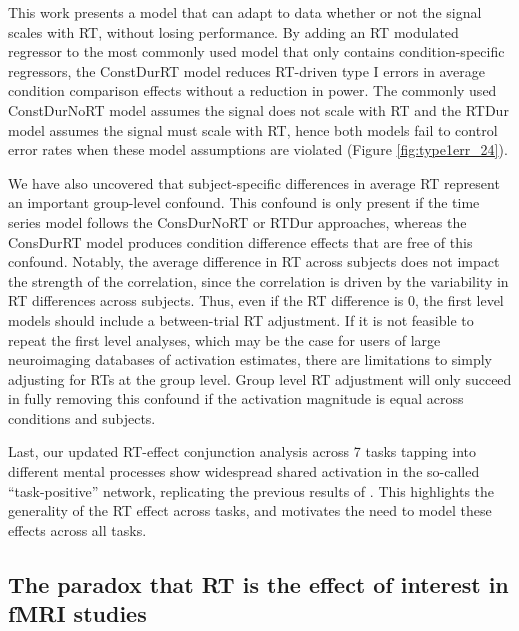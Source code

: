 \documentclass[titlepage,12pt] {article}
\begin{document}
This work presents a model that can adapt to data whether or not the signal scales with RT, without losing performance. By adding an RT modulated regressor to the most commonly used model that only contains condition-specific regressors, the ConstDurRT model reduces RT-driven type I errors in average condition comparison effects without a reduction in power.  The commonly used ConstDurNoRT model assumes the signal does not scale with RT and the RTDur model assumes the signal must scale with RT, hence both models fail to control error rates when these model assumptions are violated (Figure \ref{fig:type1err_24}).  


We have also uncovered that subject-specific differences in average RT represent an important group-level confound.  This confound is only present if the time series model follows the ConsDurNoRT or RTDur approaches, whereas the ConsDurRT model produces condition difference effects that are free of this confound.  Notably, the average difference in RT across subjects does not impact the strength of the correlation, since the correlation is driven by the variability in RT differences across subjects.  Thus, even if the RT difference is 0, the first level models should include a between-trial RT adjustment.  If it is not feasible to repeat the first level analyses, which may be the case for users of large neuroimaging databases of activation estimates, there are limitations to simply adjusting for RTs at the group level. Group level RT adjustment will only succeed in fully removing this confound if the activation magnitude is equal across conditions and subjects.


Last, our updated RT-effect conjunction analysis across 7 tasks tapping into different mental processes show widespread shared activation in the so-called ``task-positive'' network, replicating the previous results of \citet{yarkoni_bold_2009}. This highlights the generality of the RT effect across tasks, and motivates the need to model these effects across all tasks.  

\subsection*{The paradox that RT is the effect of interest in fMRI studies}
\end{document}
